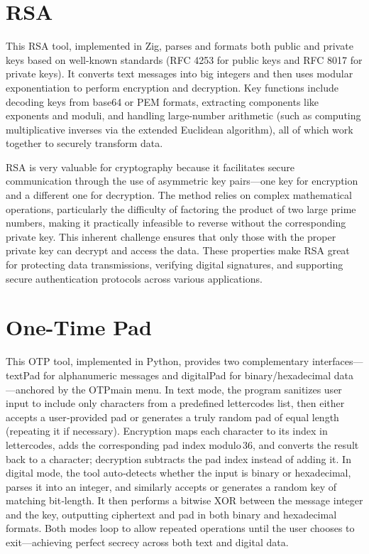 \documentclass[11pt]{article}
\begin{document}
\begin{multicols}{2}
\begin{spacing}{1.125}
        	\section{RSA}
        	This RSA tool, implemented in Zig, parses and formats both public and private keys based on well-known standards (RFC 4253 for public keys and RFC 8017 for private keys). It converts text messages into big integers and then uses modular exponentiation to perform encryption and decryption. Key functions include decoding keys from base64 or PEM formats, extracting components like exponents and moduli, and handling large-number arithmetic (such as computing multiplicative inverses via the extended Euclidean algorithm), all of which work together to securely transform data.

		RSA is very valuable for cryptography because it facilitates secure communication through the use of asymmetric key pairs—one key for encryption and a different one for decryption. The method relies on complex mathematical operations, particularly the difficulty of factoring the product of two large prime numbers, making it practically infeasible to reverse without the corresponding private key. This inherent challenge ensures that only those with the proper private key can decrypt and access the data. These properties make RSA great for protecting data transmissions, verifying digital signatures, and supporting secure authentication protocols across various applications.
  
        	\section{One-Time Pad}
        	This OTP tool, implemented in Python, provides two complementary interfaces—textPad for alphanumeric messages and digitalPad for binary/hexadecimal data—anchored by the OTPmain menu. In text mode, the program sanitizes user input to include only characters from a predefined lettercodes list, then either accepts a user‑provided pad or generates a truly random pad of equal length (repeating it if necessary). Encryption maps each character to its index in lettercodes, adds the corresponding pad index modulo 36, and converts the result back to a character; decryption subtracts the pad index instead of adding it. In digital mode, the tool auto‑detects whether the input is binary or hexadecimal, parses it into an integer, and similarly accepts or generates a random key of matching bit‑length. It then performs a bitwise XOR between the message integer and the key, outputting ciphertext and pad in both binary and hexadecimal formats. Both modes loop to allow repeated operations until the user chooses to exit—achieving perfect secrecy across both text and digital data.


\end{spacing}
\end{multicols}
\end{document}
